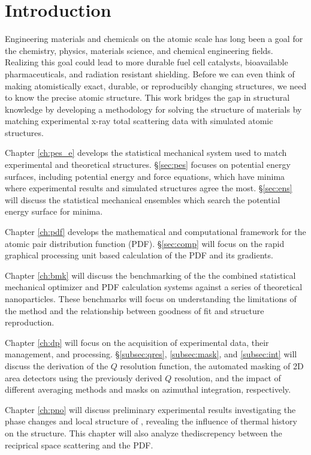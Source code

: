 \chapter{Introduction} \label{intro}
Engineering materials and chemicals on the atomic scale has long been a goal for the chemistry, physics, materials science, and chemical engineering fields.
Realizing this goal could lead to more durable fuel cell catalysts, bioavailable pharmaceuticals, and radiation  resistant shielding.
Before we can even think of making atomistically exact, durable, or reproducibly changing structures, we need to know the precise atomic structure.
This work bridges the gap in structural knowledge by developing a methodology for solving the structure of materials by matching experimental x-ray total scattering data with simulated atomic structures.

Chapter \ref{ch:pes_e} develops the statistical mechanical system used to match experimental and theoretical structures.
\S \ref{sec:pes} focuses on potential energy surfaces, including potential energy and force equations, which have minima where experimental results and simulated structures agree the most.
\S \ref{sec:ens} will discuss the statistical mechanical ensembles which search the potential energy surface for minima.

Chapter \ref{ch:pdf} develops the mathematical and computational framework for the atomic pair distribution function (PDF).
\S \ref{sec:comp} will focus on the rapid graphical processing unit based calculation of the PDF and its gradients.

Chapter \ref{ch:bmk} will discuss the benchmarking of the the combined statistical mechanical optimizer and PDF calculation systems against a series of theoretical nanoparticles.
These benchmarks will focus on understanding the limitations of the method and the relationship between goodness of fit and structure reproduction.

Chapter \ref{ch:dp} will focus on the acquisition of experimental data, their management, and processing.
\S \ref{subsec:qres}, \ref{subsec:mask}, and \ref{subsec:int} will discuss the derivation of the $Q$ resolution function, the automated masking of 2D area detectors using the previously derived $Q$ resolution, and the impact of different averaging methods and masks on azimuthal integration, respectively.

Chapter \ref{ch:pno} will discuss preliminary experimental results investigating the phase changes and local structure of , revealing the influence of thermal history on the structure.
This chapter will also analyze thediscrepency between the reciprical space scattering and the PDF.